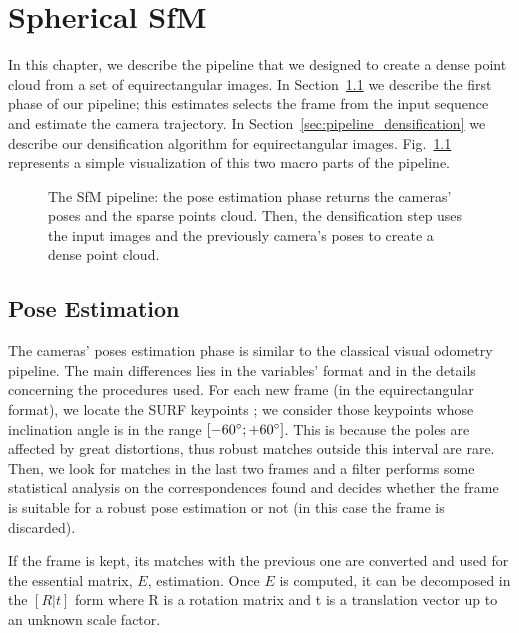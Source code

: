 \chapter{Spherical SfM}
In this chapter, we describe the pipeline that we designed to create a dense 
point cloud from a set of equirectangular images.
In Section~\ref{sec:pipeline_pose_estimation} we describe the first phase of our
pipeline; this estimates selects the frame from the input sequence and estimate
the camera trajectory. In Section~\ref{sec:pipeline_densification} we describe 
our densification algorithm for equirectangular images.
Fig.~\ref{fig:pipeline_overview}
represents a simple visualization of this two macro parts of the 
pipeline.

\begin{figure}
    \centering
    \def\svgwidth{\columnwidth}
    
    \caption{The SfM pipeline: the pose estimation phase returns the cameras' 
    poses and the sparse points cloud. Then, the densification step uses 
    the input images and the previously camera's poses to create a dense
    point cloud.}
	\label{fig:pipeline_overview}
\end{figure}

\section{Pose Estimation}
\label{sec:pipeline_pose_estimation}
The cameras' poses estimation phase is similar to the classical visual 
odometry pipeline. The main differences lies in the variables' format and in 
the details concerning the procedures used.
For each new frame  (in the equirectangular format), we locate the
SURF keypoints \cite{bay2006surf}; we consider those keypoints whose inclination angle is in the range $[-60\degree; +60\degree]$. This is because the poles are affected by great 
distortions, thus robust matches outside this interval are rare.
Then, we look for matches in the last two frames and a filter performs some 
statistical analysis on the correspondences found and decides whether the frame 
is suitable for a robust pose estimation or not (in this case the frame is 
discarded).

If the frame is kept, its matches with the previous one are converted
and used for the essential matrix, $E$, estimation. Once $E$ is computed, 
it can be decomposed in the \([R|t]\) form where R is a rotation matrix 
and t is a translation vector up to an unknown scale factor.

